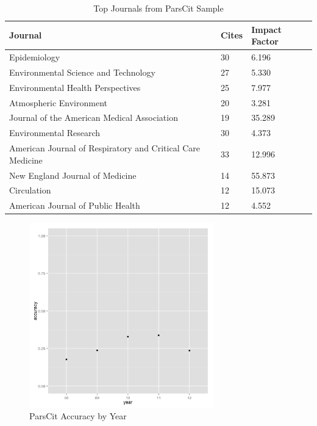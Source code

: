 \documentclass[12pt]{article}
\begin{document}
\begin{table}[ht]
\centering
\caption{Top Journals from ParsCit Sample}\label{tab:pcimpact}
\begin{tabular}{lll}
  \hline
  \hline
 Journal & Cites & Impact Factor\\
 \hline
Epidemiology & 30 & 6.196\\
Environmental Science and Technology & 27 & 5.330 \\
Environmental Health Perspectives & 25 & 7.977\\
Atmospheric Environment & 20 & 3.281\\
Journal of the American Medical Association & 19 & 35.289\\
Environmental Research & 30 & 4.373\\ 
American Journal of Respiratory and Critical Care Medicine & 33 & 12.996\\
New England Journal of Medicine & 14 & 55.873\\
Circulation & 12 & 15.073\\
American Journal of Public Health & 12 & 4.552\\
  \hline
  \hline
\end{tabular}
\end{table}

\begin{figure}
\begin{center}
\includegraphics[height=8cm]{yearly_accuracy.png}
\caption{ParsCit Accuracy by Year}
\label{fig:yearlyaccuracy}
\end{center}
\end{figure}
\end{document}
